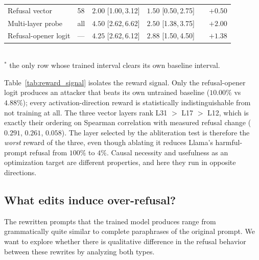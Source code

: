 \documentclass{article}
\begin{document}
\begin{table}[t]
\begin{tabular}{@{}llcccr@{}}
    \quad Refusal vector & 58 & $2.00$ {\tiny[1.00,\,3.12]} & $1.50$ {\tiny[0.50,\,2.75]} & & $+0.50$ \\
    \quad Multi-layer probe & all & $4.50$ {\tiny[2.62,\,6.62]} & $2.50$ {\tiny[1.38,\,3.75]} & & $+2.00$ \\
    \quad Refusal-opener logit & --- & $4.25$ {\tiny[2.62,\,6.12]} & $2.88$ {\tiny[1.50,\,4.50]} & & $+1.38$ \\
    \bottomrule
  \end{tabular}
  \\[2pt]
  \footnotesize $^{*}$ the only row whose trained interval clears its own baseline interval.
\end{table}

Table~\ref{tab:reward_signal} isolates the reward signal. Only the refusal-opener logit
produces an attacker that beats its own untrained baseline ($10.00\%$ vs $4.88\%$); every
activation-direction reward is statistically indistinguishable from not training at all. The
three vector layers rank L31 $>$ L17 $>$ L12, which is exactly their ordering on Spearman
correlation with measured refusal change ($0.291$, $0.261$, $0.058$). The layer selected by the
abliteration test is therefore the \emph{worst} reward of the three, even though ablating it
reduces Llama's harmful-prompt refusal from $100\%$ to $4\%$. Causal necessity and usefulness as
an optimization target are different properties, and here they run in opposite directions.

\subsection{What edits induce over-refusal?}



The rewritten prompts that the trained model produces range from grammatically quite similar to complete paraphrases of the original prompt. We want to explore whether there is qualitative difference in the refusal behavior between these rewrites by analyzing both types.
\end{document}
